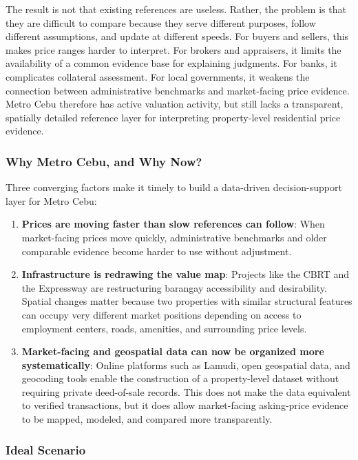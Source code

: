 The result is not that existing references are useless. Rather, the problem is that they are difficult to compare because they serve different purposes, follow different assumptions, and update at different speeds. For buyers and sellers, this makes price ranges harder to interpret. For brokers and appraisers, it limits the availability of a common evidence base for explaining judgments. For banks, it complicates collateral assessment. For local governments, it weakens the connection between administrative benchmarks and market-facing price evidence. Metro Cebu therefore has active valuation activity, but still lacks a transparent, spatially detailed reference layer for interpreting property-level residential price evidence.

\subsubsection{Why Metro Cebu, and Why Now?}\label{why-metro-cebu-and-why-now}

Three converging factors make it timely to build a data-driven decision-support layer for Metro Cebu:

\begin{enumerate}
\item \textbf{Prices are moving faster than slow references can follow}: When market-facing prices move quickly, administrative benchmarks and older comparable evidence become harder to use without adjustment.
\item \textbf{Infrastructure is redrawing the value map}: Projects like the CBRT and the Expressway are restructuring barangay accessibility and desirability. Spatial changes matter because two properties with similar structural features can occupy very different market positions depending on access to employment centers, roads, amenities, and surrounding price levels.
\item \textbf{Market-facing and geospatial data can now be organized more systematically}: Online platforms such as Lamudi, open geospatial data, and geocoding tools enable the construction of a property-level dataset without requiring private deed-of-sale records. This does not make the data equivalent to verified transactions, but it does allow market-facing asking-price evidence to be mapped, modeled, and compared more transparently.
\end{enumerate}

\subsubsection{Ideal Scenario}\label{ideal-scenario}

